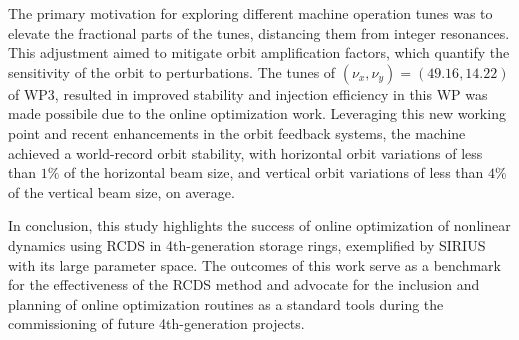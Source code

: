 The primary motivation for exploring different machine operation tunes was to elevate the fractional parts of the tunes, distancing them from integer resonances. This adjustment aimed to mitigate orbit amplification factors, which quantify the sensitivity of the orbit to perturbations. The tunes of $(\nu_x, \nu_y) = (49.16, 14.22)$ of WP3, resulted in improved stability and injection efficiency in this WP was made possibile due to the online optimization work. Leveraging this new working point and recent enhancements in the orbit feedback systems, the machine achieved a world-record orbit stability, with horizontal orbit variations  of less than $1\%$ of the horizontal beam size, and vertical orbit variations of less than $4\%$ of the vertical beam size, on average.

In conclusion, this study highlights the success of online optimization of nonlinear dynamics using RCDS in 4th-generation storage rings, exemplified by SIRIUS with its large parameter space. The outcomes of this work serve as a benchmark for the effectiveness of the RCDS method and advocate for the inclusion and planning of online optimization routines as a standard tools during the commissioning of future 4th-generation projects.
